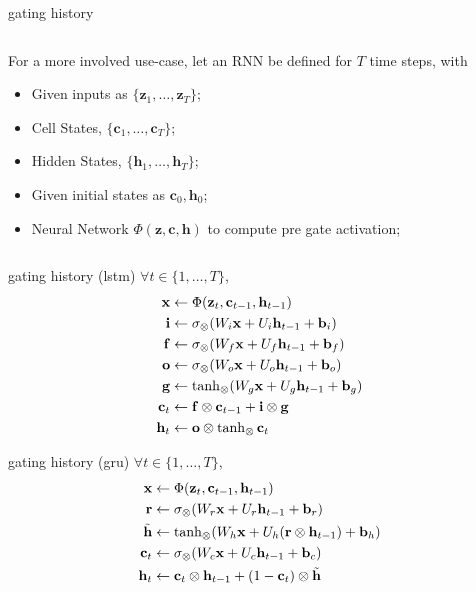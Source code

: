\documentclass[aspectratio=169,xcolor={dvipsnames,svgnames}]{beamer}
\begin{document}
\begin{frame}[label={sec:org9d696b5}]{gating history}
\begin{columns}
\begin{column}{0.7\columnwidth}
For a more involved use-case, let an RNN be defined for
\(T\) time steps, with
\begin{itemize}
\item Given inputs as
\(\{\mathbf{z}_1,\ldots,\mathbf{z}_T\}\);
\item Cell States, \(\{\mathbf{c}_1,\ldots,\mathbf{c}_T\}\);
\item Hidden States,
\(\{\mathbf{h}_1,\ldots,\mathbf{h}_T\}\);
\item Given initial states as
\(\mathbf{c}_{0},\mathbf{h}_{0}\);
\item Neural Network
\(\Phi(\mathbf{z},\mathbf{c},\mathbf{h})\) to compute
pre gate activation;
\end{itemize}
\end{column}
\end{columns}
\end{frame}
\begin{frame}[label={sec:org2c27b50}]{gating history (lstm)}
\(\forall t\in\{1,\ldots,T\}\),
\begin{align}
  \notag
  \mathbf{x}
  &\gets \Phi(\mathbf{z}_t, \mathbf{c}_{t-1},
    \mathbf{h}_{t-1}) \\
  \notag
  \mathbf{i}
  &\gets
    \sigma_{\otimes}(W_i\mathbf{x}+U_i\mathbf{h}_{t-1}
    + \mathbf{b}_i) \\
  \notag
  \mathbf{f}
  &\gets \sigma_{\otimes} (W_f\mathbf{x} +
    U_f\mathbf{h}_{t-1} + \mathbf{b}_f) \\  
  \notag
  \mathbf{o}
  &\gets \sigma_{\otimes} (W_o\mathbf{x} +
    U_o\mathbf{h}_{t-1} + \mathbf{b}_o) \\ 
  \notag
  \mathbf{g}
  &\gets \tanh_{\otimes} (W_g\mathbf{x} +
    U_g\mathbf{h}_{t-1} + \mathbf{b}_g) \\  
  \notag
  \mathbf{c}_t
  &\gets \mathbf{f}\otimes\mathbf{c}_{t-1} +
    \mathbf{i}\otimes\mathbf{g} \\
  \notag
  \mathbf{h}_t
  &\gets \mathbf{o}\otimes\tanh_{\otimes} \mathbf{c}_t
\end{align}
\end{frame}
\begin{frame}[label={sec:orgf10c634}]{gating history (gru)}
\(\forall t\in\{1,\ldots,T\}\),
\begin{align}
  \notag
  \mathbf{x}
  &\gets \Phi(\mathbf{z}_t, \mathbf{c}_{t-1},
    \mathbf{h}_{t-1}) \\
  \notag
  \mathbf{r}
  &\gets
    \sigma_{\otimes}(W_r\mathbf{x}+U_r\mathbf{h}_{t-1}
    + \mathbf{b}_r) \\
  \notag
  \tilde{\mathbf{h}}
  &\gets
    \tanh_{\otimes}(W_h\mathbf{x} +
    U_h(\mathbf{r}\otimes\mathbf{h}_{t-1}) +
    \mathbf{b}_h) \\
  \notag
  \mathbf{c}_t
  &\gets
    \sigma_{\otimes}(W_c\mathbf{x}+U_c\mathbf{h}_{t-1}
    + \mathbf{b}_c) \\
  \notag
  \mathbf{h}_t
  &\gets \mathbf{c}_t\otimes \mathbf{h}_{t-1} +
    (1-\mathbf{c}_t) \otimes \tilde{\mathbf{h}}
\end{align}
\end{frame}
\end{document}
